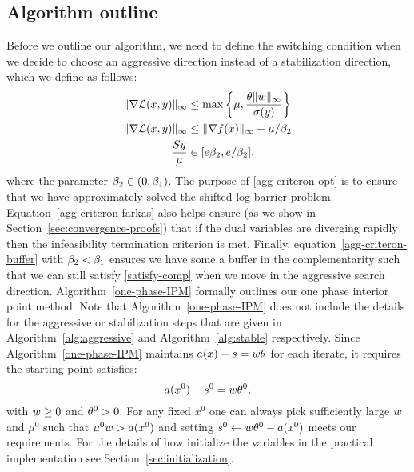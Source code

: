 \documentclass{article}
\begin{document}
\subsection{Algorithm outline}

Before we outline our algorithm, we need to define the switching condition when we decide to choose an aggressive direction instead of a stabilization direction, which we define as follows:
\begin{subequations}\label{agg-criteron}
\begin{flalign}
\| \nabla \mathcal{L}(x, y) \|_{\infty} &\le \max\left\{ \mu, \frac{\theta \| w \|_{\infty}  }{ \sigma (y) } \right\}  \label{agg-criteron-opt} \\
\| \nabla \mathcal{L}(x, y) \|_{\infty} &\le  \| \nabla f(x) \|_{\infty} + \mu / \beta_{2} \label{agg-criteron-farkas} \\
 \frac{S y}{\mu} &\in [ e \beta_{2}, e / \beta_{2} ]. \label{agg-criteron-buffer}
\end{flalign}
\end{subequations}
where the parameter $\beta_{2} \in (0, \beta_{1})$. The purpose of \eqref{agg-criteron-opt} is to ensure that we have approximately solved the shifted log barrier problem. Equation~\eqref{agg-criteron-farkas} also helps ensure (as we show in Section~\ref{sec:convergence-proofs}) that if the dual variables are diverging rapidly then the infeasibility termination criterion is met. Finally, equation~\eqref{agg-criteron-buffer} with $\beta_{2} < \beta_{1}$ ensures we have some a buffer in the complementarity such that we can still satisfy \eqref{satisfy-comp} when we move in the aggressive search direction. Algorithm~\ref{one-phase-IPM} formally outlines our one phase interior point method. Note that Algorithm~\ref{one-phase-IPM} does not include the details for the aggressive or stabilization steps that are given in Algorithm~\ref{alg:aggressive} and Algorithm~\ref{alg:stable} respectively. Since Algorithm~\ref{one-phase-IPM} maintains $a(x) + s = w \theta$ for each iterate, it requires the starting point satisfies:
$$
a(x^{0}) + s^{0} = w \theta^{0},
$$
with $w \ge 0$ and $\theta^{0} > 0$. For any fixed $x^{0}$ one can always pick sufficiently large $w$ and $\mu^{0}$ such that $\mu^{0} w > a(x^{0})$ and setting $s^{0} \gets w \theta^{0} - a(x^{0})$ meets our requirements. For the details of how initialize the variables in the practical implementation see Section~\ref{sec:initialization}.
\end{document}
